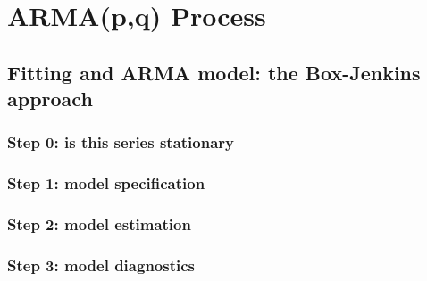             \begin{example}
            
            \end{example}

\section{ARMA(p,q) Process}

    \subsection{Fitting and ARMA model: the Box-Jenkins approach}

        \subsubsection{Step 0: is this series stationary}

        \subsubsection{Step 1: model specification}

        \subsubsection{Step 2: model estimation}

        \subsubsection{Step 3: model diagnostics}